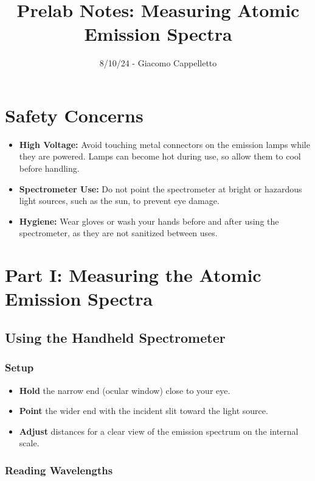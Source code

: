 \documentclass{article}
\begin{document}
\title{Prelab Notes: Measuring Atomic Emission Spectra}
\date{8/10/24 - Giacomo Cappelletto}
\maketitle

\section*{Safety Concerns}

\begin{itemize}
    \item \textbf{High Voltage:} Avoid touching metal connectors on the emission lamps while they are powered. Lamps can become hot during use, so allow them to cool before handling.
    \item \textbf{Spectrometer Use:} Do not point the spectrometer at bright or hazardous light sources, such as the sun, to prevent eye damage.
    \item \textbf{Hygiene:} Wear gloves or wash your hands before and after using the spectrometer, as they are not sanitized between uses.
\end{itemize}

\section*{Part I: Measuring the Atomic Emission Spectra}

\subsection*{Using the Handheld Spectrometer}

\subsubsection*{Setup}

\begin{itemize}
    \item \textbf{Hold} the narrow end (ocular window) close to your eye.
    \item \textbf{Point} the wider end with the incident slit toward the light source.
    \item \textbf{Adjust} distances for a clear view of the emission spectrum on the internal scale.
\end{itemize}

\subsubsection*{Reading Wavelengths}
\end{document}
